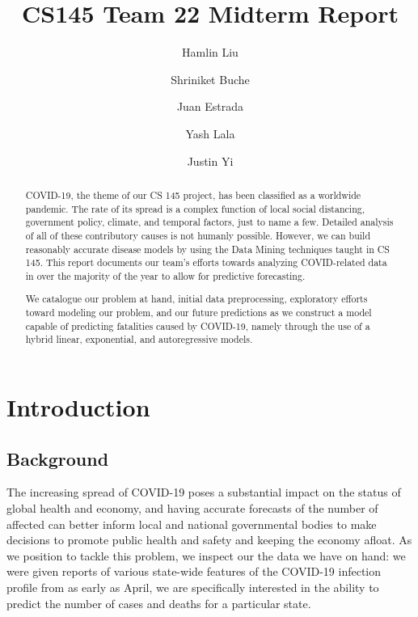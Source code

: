 \documentclass[sigconf,nonacm]{acmart}
\begin{document}
\title{CS145 Team 22 Midterm Report}

\author{Hamlin Liu}
\author{Shriniket Buche}
\author{Juan Estrada}
\author{Yash Lala}
\author{Justin Yi}
\renewcommand{\shortauthors}{Team 22}

\begin{abstract}

COVID-19, the theme of our CS 145 project, has been classified as a worldwide
pandemic. The rate of its spread is a complex function of local social
distancing, government policy, climate, and temporal factors, just to name a
few. Detailed analysis of all of these contributory causes is not humanly
possible. However, we can build reasonably accurate disease models by using the
Data Mining techniques taught in CS 145. This report documents our team’s
efforts towards analyzing COVID-related data in over the majority of the year
to allow for predictive forecasting. 

We catalogue our problem at hand, initial data preprocessing, exploratory
efforts toward modeling our problem, and our future predictions as we construct
a model capable of predicting fatalities caused by COVID-19, namely through the
use of a hybrid linear, exponential, and autoregressive models. 

\end{abstract}

\maketitle

\section{Introduction}

\subsection{Background}

The increasing spread of COVID-19 poses a substantial impact on the status of
global health and economy, and having accurate forecasts of the number of
affected can better inform local and national governmental bodies to make
decisions to promote public health and safety and keeping the economy afloat.
As we position to tackle this problem, we inspect our the data we have on hand:
we were given reports of various state-wide features of the COVID-19 infection
profile from as early as April, we are specifically interested in the ability
to predict the number of cases and deaths for a particular state.
\end{document}
